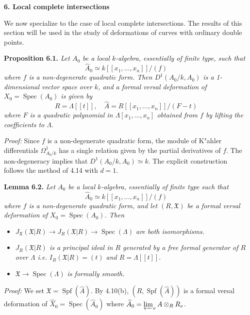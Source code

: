 \documentclass[11pt]{article}
\theoremstyle{plain}
\theoremstyle{definition}
\theoremstyle{remark}
\DeclareMathOperator{\Spec}{Spec}
\DeclareMathOperator{\Spf}{Spf}
\begin{document}
\medskip
\noindent\textbf{6. Local complete intersections}

\medskip
We now specialize to the case of local complete intersections. The results of this section will be used in the study of deformations of curves with ordinary double points.

\medskip
\noindent\textbf{Proposition 6.1.} \textit{Let $A_0$ be a local $k$-algebra, essentially of finite type, such that}
\[\widehat{A}_0 \simeq k[[x_1, \ldots, x_n]]/(f)\]
\textit{where $f$ is a non-degenerate quadratic form. Then $D^1(A_0/k, A_0)$ is a 1-dimensional vector space over $k$, and a formal versal deformation of $X_0 = \Spec(A_0)$ is given by}
\[R = \Lambda[[t]], \quad \widehat{A} = R[[x_1, \ldots, x_n]]/(F - t)\]
\textit{where $F$ is a quadratic polynomial in $\Lambda[x_1, \ldots, x_n]$ obtained from $f$ by lifting the coefficients to $\Lambda$.}

\medskip
\noindent\textit{Proof:} Since $f$ is a non-degenerate quadratic form, the module of K"ahler differentials $\Omega_{A_0/k}^1$ has a single relation given by the partial derivatives of $f$. The non-degeneracy implies that $D^1(A_0/k, A_0) \simeq k$. The explicit construction follows the method of 4.14 with $d = 1$.

\medskip
\noindent\textbf{Lemma 6.2.} \textit{Let $A_0$ be a local $k$-algebra, essentially of finite type such that}
\[\widehat{A}_0 \simeq k[[x_1, \ldots, x_n]]/(f)\]
\textit{where $f$ is a non-degenerate quadratic form, and let $(R, \mathfrak{X})$ be a formal versal deformation of $X_0 = \Spec(A_0)$. Then}
\begin{itemize}
\item[(1)] \textit{$J_{\mathfrak{X}}(\mathfrak{X}|R) \to J_R(\mathfrak{X}|R) \to \Spec(\Lambda)$ are both isomorphisms.}
\item[(2)] \textit{$J_R(\mathfrak{X}|R)$ is a principal ideal in $R$ generated by a free formal generator of $R$ over $\Lambda$ i.e. $I_R(\mathfrak{X}|R) = (t)$ and $R = \Lambda[[t]]$.}
\item[(3)] \textit{$\mathfrak{X} \to \Spec(\Lambda)$ is formally smooth.}
\end{itemize}

\medskip
\noindent\textit{Proof:} We set $\mathfrak{X} = \Spf(\widehat{A})$. By 4.10(b), $(R, \Spf(\widehat{A}))$ is a formal versal deformation of $\widehat{X}_0 = \Spec(\widehat{A}_0)$ where $\widehat{A}_0 = \varprojlim_v A \otimes_R R_v$.
\end{document}
